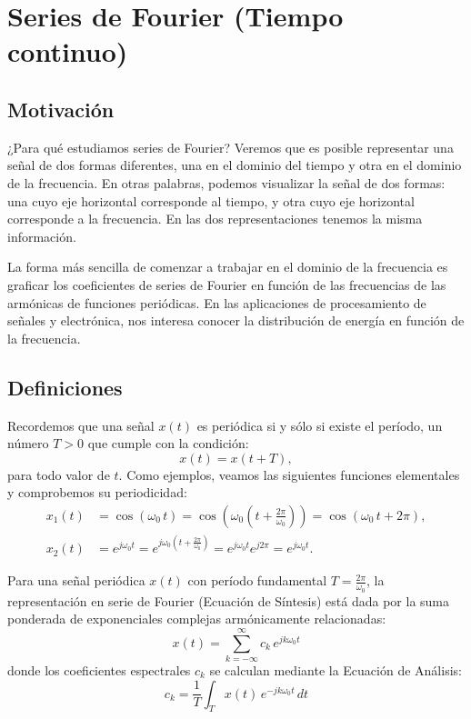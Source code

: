\chapter{Series de Fourier (Tiempo continuo)}

\section{Motivación}

¿Para qué estudiamos series de Fourier? Veremos que es posible representar una señal de dos formas diferentes, una en el dominio del tiempo y otra en el dominio de la frecuencia. En otras palabras, podemos visualizar la señal de dos formas: una cuyo eje horizontal corresponde al tiempo, y otra cuyo eje horizontal corresponde a la frecuencia. En las dos representaciones tenemos la misma información.

La forma más sencilla de comenzar a trabajar en el dominio de la frecuencia es graficar los coeficientes de series de Fourier en función de las frecuencias de las armónicas de funciones periódicas. En las aplicaciones de procesamiento de señales y electrónica, nos interesa conocer la distribución de energía en función de la frecuencia.

\section{Definiciones}

Recordemos que una señal $x(t)$ es periódica si y sólo si existe el período, un número $T > 0$ que cumple con la condición:
\begin{equation}
	x(t) = x(t+T),
\end{equation}
para todo valor de $t$. Como ejemplos, veamos las siguientes funciones elementales y comprobemos su periodicidad:
\begin{align}
	x_1(t) &= \cos(\omega_0 \, t) = \cos\left(\omega_0 \left(t + \frac{2\pi}{\omega_0}\right)\right) = \cos(\omega_0 \, t + 2\pi), \\
	x_2(t) &= e^{j \omega_0 t} = e^{j \omega_0 \left(t + \frac{2\pi}{\omega_0}\right)} = e^{j \omega_0 t} e^{j 2\pi} = e^{j \omega_0 t}.
\end{align}

Para una señal periódica $x(t)$ con período fundamental $T = \frac{2\pi}{\omega_0}$, la representación en serie de Fourier (Ecuación de Síntesis) está dada por la suma ponderada de exponenciales complejas armónicamente relacionadas:
\begin{equation}
	x(t) = \sum_{k=-\infty}^{\infty} c_k \, e^{j k \omega_0 t}
\end{equation}
donde los coeficientes espectrales $c_k$ se calculan mediante la Ecuación de Análisis:
\begin{equation}
	c_k = \frac{1}{T} \int_{T} x(t) \, e^{-j k \omega_0 t} \, dt
\end{equation}

